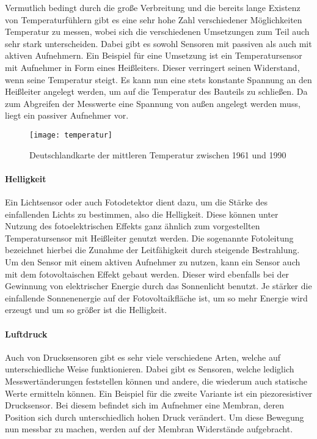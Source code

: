 Vermutlich bedingt durch die große Verbreitung und die bereits lange Existenz von Temperaturfühlern gibt es eine sehr hohe Zahl verschiedener Möglichkeiten Temperatur zu messen, wobei sich die verschiedenen Umsetzungen zum Teil auch sehr stark unterscheiden. Dabei gibt es sowohl Sensoren mit passiven als auch mit aktiven Aufnehmern.\newline
Ein Beispiel für eine Umsetzung ist ein Temperatursensor mit Aufnehmer in Form eines Heißleiters. Dieser verringert seinen Widerstand, wenn seine Temperatur steigt. Es kann nun eine stets konstante Spannung an den Heißleiter angelegt werden, um auf die Temperatur des Bauteils zu schließen. Da zum Abgreifen der Messwerte eine Spannung von außen angelegt werden muss, liegt ein passiver Aufnehmer vor.

\begin{figure}[htbp]
\centering
\caption{Deutschlandkarte der mittleren Temperatur zwischen 1961 und 1990}
\label{fig:temperatur}
\texttt{[image: temperatur]}
\end{figure}

\paragraph{Helligkeit}

Ein Lichtsensor oder auch Fotodetektor dient dazu, um die Stärke des einfallenden Lichts zu bestimmen, also die Helligkeit. Diese können unter Nutzung des fotoelektrischen Effekts ganz ähnlich zum vorgestellten Temperatursensor mit Heißleiter genutzt werden. Die sogenannte Fotoleitung bezeichnet hierbei die Zunahme der Leitfähigkeit durch steigende Bestrahlung. Um den Sensor mit einem aktiven Aufnehmer zu nutzen, kann ein Sensor auch mit dem fotovoltaischen Effekt gebaut werden. Dieser wird ebenfalls bei der Gewinnung von elektrischer Energie durch das Sonnenlicht benutzt. Je stärker die einfallende Sonnenenergie auf der Fotovoltaikfläche ist, um so mehr Energie wird erzeugt und um so größer ist die Helligkeit.

\paragraph{Luftdruck}

Auch von Drucksensoren gibt es sehr viele verschiedene Arten, welche auf unterschiedliche Weise funktionieren. Dabei gibt es Sensoren, welche lediglich Messwertänderungen feststellen können und andere, die wiederum auch statische Werte ermitteln können. Ein Beispiel für die zweite Variante ist ein piezoresistiver Drucksensor. Bei diesem befindet sich im Aufnehmer eine Membran, deren Position sich durch unterschiedlich hohen Druck verändert. Um diese Bewegung nun messbar zu machen, werden auf der Membran Widerstände aufgebracht.

